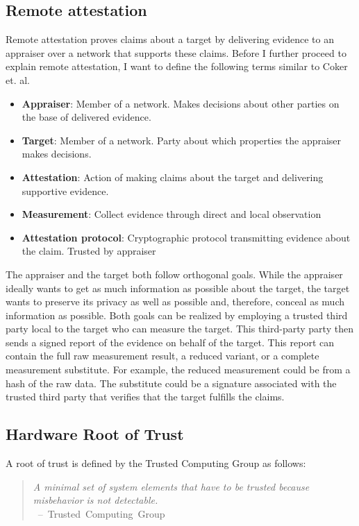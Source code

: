 \subsection{Remote attestation}Remote attestation proves claims about a target
by delivering evidence to an appraiser over a network that supports these
claims. Before I further proceed to explain remote attestation, I want to
define the following terms similar to Coker et. al.\cite{coker_principles_2011}
\begin{itemize}
    \item \textbf{Appraiser}: Member of a network. Makes decisions about other
          parties on the base of delivered evidence.
    \item \textbf{Target}: Member of a network. Party about which properties the
          appraiser makes decisions.
    \item \textbf{Attestation}: Action of making claims about the target and
          delivering supportive evidence.
    \item \textbf{Measurement}: Collect evidence through direct and local
          observation
    \item \textbf{Attestation protocol}: Cryptographic protocol transmitting
          evidence about the claim. Trusted by appraiser
\end{itemize}

The appraiser and the target both follow orthogonal goals. While the appraiser
ideally wants to get as much information as possible about the target, the
target wants to preserve its privacy as well as possible and, therefore, conceal
as much information as possible. Both goals can be realized by employing a
trusted third party local to the target who can measure the target. This
third-party party then sends a signed report of the evidence on behalf of the
target. This report can contain the full raw measurement result, a reduced
variant, or a complete measurement substitute. For example, the reduced
measurement could be from a hash of the raw data. The substitute could be a
signature associated with the trusted third party that verifies that the target
fulfills the claims.

\subsection{Hardware Root of Trust}
\label{sec:20:hardware_root_of_trust}
A root of trust is defined by the Trusted Computing Group as follows:
\begin{quote}
    \textit{ A minimal set of system elements that have to be trusted because
        misbehavior is not detectable. \\
    } \mbox{ -- Trusted Computing Group\cite{tpm_architecture}}
\end{quote}

